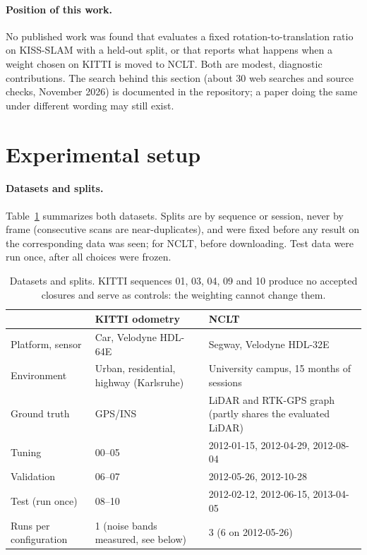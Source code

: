 \documentclass[11pt,a4paper]{article}
\begin{document}
\paragraph{Position of this work.} No published work was found that evaluates a fixed rotation-to-translation
ratio on KISS-SLAM with a held-out split, or that reports what happens when a weight chosen on KITTI is moved to
NCLT. Both are modest, diagnostic contributions. The search behind this section (about 30 web searches and
source checks, November 2026) is documented in the repository; a paper doing the same under different wording
may still exist.

\section{Experimental setup}
\label{sec:setup}

\paragraph{Datasets and splits.} Table~\ref{tab:data} summarizes both datasets. Splits are by sequence or
session, never by frame (consecutive scans are near-duplicates), and were fixed before any result on the
corresponding data was seen; for NCLT, before downloading. Test data were run once, after all choices were
frozen.

\begin{table}[h]
\centering
\small
\begin{tabularx}{\linewidth}{lXX}
\toprule
 & KITTI odometry~\cite{kitti} & NCLT~\cite{nclt} \\
\midrule
Platform, sensor & Car, Velodyne HDL-64E & Segway, Velodyne HDL-32E \\
Environment & Urban, residential, highway (Karlsruhe) & University campus, 15 months of sessions \\
Ground truth & GPS/INS & LiDAR and RTK-GPS graph (partly shares the evaluated LiDAR) \\
Tuning & 00--05 & 2012-01-15, 2012-04-29, 2012-08-04 \\
Validation & 06--07 & 2012-05-26, 2012-10-28 \\
Test (run once) & 08--10 & 2012-02-12, 2012-06-15, 2013-04-05 \\
Runs per configuration & 1 (noise bands measured, see below) & 3 (6 on 2012-05-26) \\
\bottomrule
\end{tabularx}
\caption{Datasets and splits. KITTI sequences 01, 03, 04, 09 and 10 produce no accepted closures and serve as
controls: the weighting cannot change them.}
\label{tab:data}
\end{table}
\end{document}
